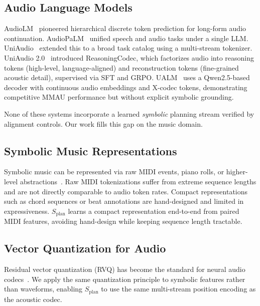 \documentclass[11pt]{article}
\newcommand{\splan}{$S_{\mathrm{plan}}$}
\begin{document}
\subsection{Audio Language Models}

AudioLM~\citep{borsos2023audiolm} pioneered hierarchical discrete token prediction for
long-form audio continuation.  AudioPaLM~\citep{rubenstein2023audiopalm} unified speech
and audio tasks under a single LLM.  UniAudio~\citep{yang2024uniaudio} extended this to
a broad task catalog using a multi-stream tokenizer.  UniAudio 2.0~\citep{yang2026uniaudio2}
introduced ReasoningCodec, which factorizes audio into reasoning tokens (high-level,
language-aligned) and reconstruction tokens (fine-grained acoustic detail), supervised
via SFT and GRPO.  UALM~\citep{ualm2025} uses a Qwen2.5-based decoder with continuous
audio embeddings and X-codec tokens, demonstrating competitive MMAU performance but
without explicit symbolic grounding.

None of these systems incorporate a learned \emph{symbolic} planning stream verified by
alignment controls.  Our work fills this gap on the music domain.

\subsection{Symbolic Music Representations}

Symbolic music can be represented via raw MIDI events, piano rolls, or higher-level
abstractions~\citep{fradet2021miditok,hawthorne2019enabling}.  Raw MIDI tokenizations
suffer from extreme sequence lengths and are not directly comparable to audio token
rates.  Compact representations such as chord sequences or beat annotations are
hand-designed and limited in expressiveness.  \splan{} learns a compact representation
end-to-end from paired MIDI features, avoiding hand-design while keeping sequence
length tractable.

\subsection{Vector Quantization for Audio}

Residual vector quantization (RVQ) has become the standard for neural audio
codecs~\citep{zeghidour2021soundstream,defossez2022high,kumar2024highfidelity}.
We apply the same quantization principle to symbolic features rather than waveforms,
enabling \splan{} to use the same multi-stream position encoding as the acoustic codec.
\end{document}
